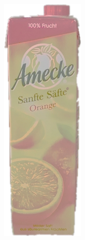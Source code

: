 \documentclass[a4paper,12pt,oneside]{article}
\begin{document}
\begin{figure}[htb]
\begin{minipage}[c]{0.08\textwidth}
\includegraphics[width=\textwidth]{Sources/Bild2_HS.png}

\end{minipage}
\end{figure}
\end{document}
